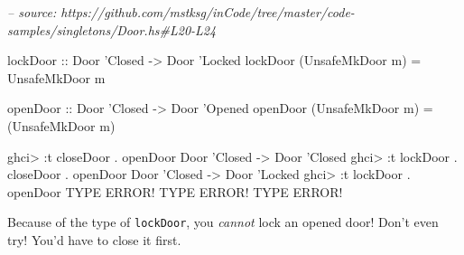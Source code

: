 \documentclass[]{article}
\newenvironment{Shaded}{}{}
\newcommand{\CommentTok}[1]{\textcolor[rgb]{0.38,0.63,0.69}{\textit{#1}}}
\newcommand{\DataTypeTok}[1]{\textcolor[rgb]{0.56,0.13,0.00}{#1}}
\newcommand{\FunctionTok}[1]{\textcolor[rgb]{0.02,0.16,0.49}{#1}}
\newcommand{\NormalTok}[1]{#1}
\newcommand{\OtherTok}[1]{\textcolor[rgb]{0.00,0.44,0.13}{#1}}
\begin{document}
\begin{Shaded}
\begin{Highlighting}[]
\CommentTok{-- source: https://github.com/mstksg/inCode/tree/master/code-samples/singletons/Door.hs#L20-L24}

\OtherTok{lockDoor ::} \DataTypeTok{Door}\NormalTok{ '}\DataTypeTok{Closed} \OtherTok{->} \DataTypeTok{Door}\NormalTok{ '}\DataTypeTok{Locked}
\NormalTok{lockDoor (}\DataTypeTok{UnsafeMkDoor}\NormalTok{ m) }\FunctionTok{=} \DataTypeTok{UnsafeMkDoor}\NormalTok{ m}

\OtherTok{openDoor ::} \DataTypeTok{Door}\NormalTok{ '}\DataTypeTok{Closed} \OtherTok{->} \DataTypeTok{Door}\NormalTok{ '}\DataTypeTok{Opened}
\NormalTok{openDoor (}\DataTypeTok{UnsafeMkDoor}\NormalTok{ m) }\FunctionTok{=}\NormalTok{ (}\DataTypeTok{UnsafeMkDoor}\NormalTok{ m)}
\end{Highlighting}
\end{Shaded}

\begin{Shaded}
\begin{Highlighting}[]
\NormalTok{ghci}\FunctionTok{>} \FunctionTok{:}\NormalTok{t closeDoor }\FunctionTok{.}\NormalTok{ openDoor}
\DataTypeTok{Door}\NormalTok{ '}\DataTypeTok{Closed} \OtherTok{->} \DataTypeTok{Door}\NormalTok{ '}\DataTypeTok{Closed}
\NormalTok{ghci}\FunctionTok{>} \FunctionTok{:}\NormalTok{t lockDoor }\FunctionTok{.}\NormalTok{ closeDoor }\FunctionTok{.}\NormalTok{ openDoor}
\DataTypeTok{Door}\NormalTok{ '}\DataTypeTok{Closed} \OtherTok{->} \DataTypeTok{Door}\NormalTok{ '}\DataTypeTok{Locked}
\NormalTok{ghci}\FunctionTok{>} \FunctionTok{:}\NormalTok{t lockDoor }\FunctionTok{.}\NormalTok{ openDoor}
\DataTypeTok{TYPE} \DataTypeTok{ERROR}\FunctionTok{!}  \DataTypeTok{TYPE} \DataTypeTok{ERROR}\FunctionTok{!}  \DataTypeTok{TYPE} \DataTypeTok{ERROR}\FunctionTok{!}
\end{Highlighting}
\end{Shaded}

Because of the type of \texttt{lockDoor}, you \emph{cannot} lock an opened door!
Don't even try! You'd have to close it first.
\end{document}
